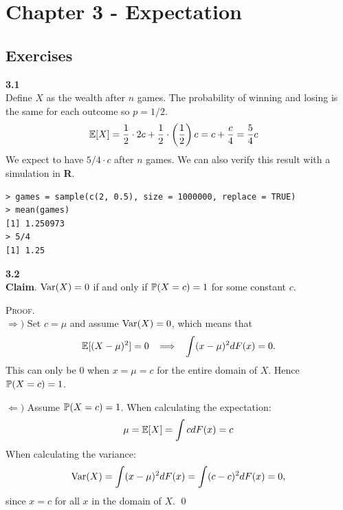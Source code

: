 
\newpage
\section{Chapter 3 - Expectation}

\subsection*{Exercises}

\bigskip\noindent
\textbf{3.1}\\  %
Define $X$ as the wealth after $n$ games. The probability of winning and losing is the same
for each outcome so $p = 1/2$.
\begin{align*}
    \E[X] &= \frac{1}{2}\cdot 2c+ \frac{1}{2}\cdot \left(\frac{1}{2}\right)c
    = c + \frac{c}{4} = \frac{5}{4}c
\end{align*}
We expect to have $5/4\cdot c$ after $n$ games. We can also verify this result with a simulation
in \textbf{R}.
\begin{lstlisting}[style=RSyntax, title=R]
> games = sample(c(2, 0.5), size = 1000000, replace = TRUE)
> mean(games)
[1] 1.250973
> 5/4
[1] 1.25
\end{lstlisting}

\bigskip\noindent
\textbf{3.2}\\  %
\textbf{Claim}. $\V(X) = 0$ if and only if $\P(X = c) = 1$ for some constant $c$.

\medskip\noindent\textsc{Proof}.\\
$\Rightarrow)$ Set $c = \mu$ and assume $\V(X) = 0$, which means that
$$
\E[(X - \mu)^2] = 0
\imp
\int (x - \mu)^2dF(x) = 0.
$$
This can only be 0 when $x = \mu = c$ for the entire domain of $X$. Hence $\P(X = c) = 1$.

\medskip\noindent
$\Leftarrow)$ Assume $\P(X=c) = 1$. When calculating the expectation:
$$
\mu = \E[X] = \int c dF(x) = c
$$
When calculating the variance:
$$
\V(X) = \int (x - \mu)^2dF(x) = \int (c - c)^2dF(x) = 0,
$$
since $x = c$ for all $x$ in the domain of $X$. \qed

